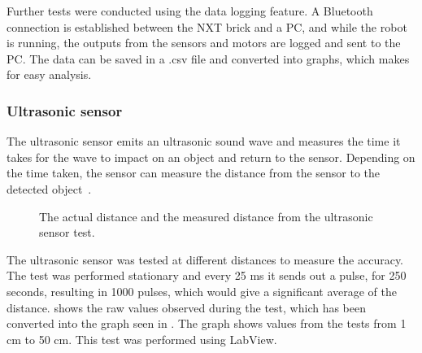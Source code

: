 Further tests were conducted using the data logging feature. A Bluetooth connection is established between the NXT brick and a PC, and while the robot is running, the outputs from the sensors and motors are logged and sent to the PC. The data can be saved in a .csv file and converted into graphs, which makes for easy analysis.

\subsubsection{Ultrasonic sensor} \label{sec:ultrasonic_sensor}
The ultrasonic sensor emits an ultrasonic sound wave and measures the time it takes for the wave to impact on an object and return to the sensor. Depending on the time taken, the sensor can measure the distance from the sensor to the detected object~\citep{lego_education}. 

\begin{figure}[H]
     \caption{\label{fig:ultrasonic_sensor_test_graph} The actual distance and the measured distance from the ultrasonic sensor test.}
\end{figure}

The ultrasonic sensor was tested at different distances to measure the accuracy. The test was performed stationary and every 25 ms it sends out a pulse, for 250 seconds, resulting in 1000 pulses, which would give a significant average of the distance.  shows the raw values observed during the test, which has been converted into the graph seen in . The graph shows values from the tests from 1 cm to 50 cm. This test was performed using LabView.

